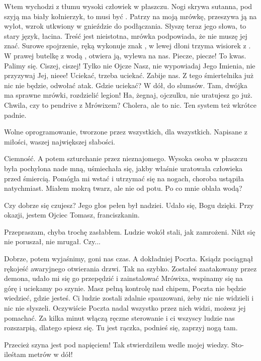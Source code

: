 Wtem wychodzi z tłumu wysoki człowiek w płaszczu.
Nogi skrywa sutanna, pod szyją ma biały kołnierzyk, to musi być \censor{}.
Patrzy na moją mrówkę, przeszywa ją na wylot, wzrok utkwiony w gnieździe do podłączania.
Słyszę teraz jego słowa, to stary język, łacina. Treść jest nieistotna, mrówka podpowiada, że nie muszę jej znać.
Surowe spojrzenie, ręką wykonuje znak \censor{}, w lewej dłoni trzyma wisiorek z \censor{}.
W prawej butelkę z wodą \censor{}, otwiera ją, wylewa na nas.
Piecze, piecze! To kwas. Palimy się. 
Ciszej, ciszej! Tylko nie Ojcze Nasz, nie wypowiadaj Jego Imienia, nie przyzywaj Jej, nieee!
Uciekać, trzeba uciekać. Zabije nas. Z tego śmiertelnika już nic nie będzie, odwołać atak.
Gdzie uciekać? W dół, do slumsów. Tam, dwójka ma sprawne mrówki, rozdzielić legion!
Ha, żegnaj, ojczulku, nie uratujesz go już. Chwila, czy to pendrive z Mrówixem? Cholera, ale to nic. Ten system też wkrótce padnie.

\ds{} Wolne oprogramowanie, tworzone przez wszystkich, dla wszystkich. Napisane z miłości, waszej największej słabości. \de{}

Ciemność. A potem szturchanie przez nieznajomego.
Wysoka osoba w płaszczu była pochylona nade mną, uśmiechała się, jakby właśnie uratowała człowieka przed śmiercią.
Pomógła mi wstać i utrzymać się na nogach, choroba ustąpiła natychmiast.
Miałem mokrą twarz, ale nie od potu. Po co mnie oblała wodą?

\ds{} Czy dobrze się czujesz? \dm{} Jego głos pełen był nadziei. \dm{} Udało się, Bogu dzięki. Przy okazji, jestem Ojciec Tomasz, franciszkanin. \de{}

\ds{} Przepraszam, chyba trochę zasłabłem. \dm{} Ludzie wokół stali, jak zamrożeni. Nikt się nie poruszał, nie mrugał. \dm{}
Czy... \de{}

\ds{} Dobrze, potem wyjaśnimy, goni nas czas. A dokładniej Poczta. \dm{} Ksiądz pociągnął rękojeść awaryjnego otwierania drzwi.
\dm{} Tak na szybko. Zostałeś zaatakowany przez demona, udało mi się go przepędzić i zainstalować Mrówixa, wspinamy się na górę i uciekamy po szynie.
Masz pełną kontrolę nad chipem, Poczta nie będzie wiedzieć, gdzie jesteś.
Ci ludzie zostali zdalnie spauzowani, żeby nic nie widzieli i nic nie słyszeli. Oczywiście Poczta nadal wszystko przez nich widzi, możesz jej pomachać.
Za kilka minut włączą ręczne sterowanie i ci wszyscy ludzie nas rozszarpią, dlatego spiesz się. Tu jest rączka, podnieś się, zaprzyj nogą tam.\de{}

\ds{} Przecież szyna jest pod napięciem! \dm{} Tak stwierdziłem wedle mojej wiedzy. \dm{} Sto-ileśtam metrów w dół! \de{}

